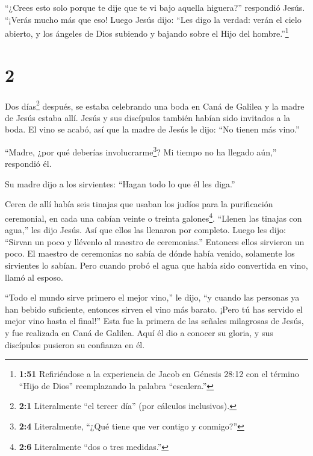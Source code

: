  ``¿Crees esto solo porque te dije que te vi bajo aquella
higuera?'' respondió Jesús. ``¡Verás mucho más que eso! 
Luego Jesús dijo: ``Les digo la verdad: verán el cielo abierto, y los
ángeles de Dios subiendo y bajando sobre el Hijo del
hombre.''\footnote{\textbf{1:51} Refiriéndose a la experiencia de Jacob
  en Génesis 28:12 con el término ``Hijo de Dios'' reemplazando la
  palabra ``escalera.''}

\hypertarget{section-1}{%
\section{2}\label{section-1}}

 Dos días\footnote{\textbf{2:1} Literalmente ``el tercer
  día'' (por cálculos inclusivos).} después, se estaba celebrando una
boda en Caná de Galilea y la madre de Jesús estaba allí. 
Jesús y sus discípulos también habían sido invitados a la boda.
 El vino se acabó, así que la madre de Jesús le dijo: ``No
tienen más vino.''

 ``Madre, ¿por qué deberías involucrarme\footnote{\textbf{2:4}
  Literalmente, ``¿Qué tiene que ver contigo y conmigo?''}? Mi tiempo no
ha llegado aún,'' respondió él.

 Su madre dijo a los sirvientes: ``Hagan todo lo que él les
diga.''

 Cerca de allí había seis tinajas que usaban los judíos para
la purificación ceremonial, en cada una cabían veinte o treinta
galones\footnote{\textbf{2:6} Literalmente ``dos o tres medidas.''}.
 ``Llenen las tinajas con agua,'' les dijo Jesús. Así que
ellos las llenaron por completo.  Luego les dijo: ``Sirvan
un poco y llévenlo al maestro de ceremonias.'' Entonces ellos sirvieron
un poco.  El maestro de ceremonias no sabía de dónde había
venido, solamente los sirvientes lo sabían. Pero cuando probó el agua
que había sido convertida en vino, llamó al esposo.

 ``Todo el mundo sirve primero el mejor vino,'' le dijo,
``y cuando las personas ya han bebido suficiente, entonces sirven el
vino más barato. ¡Pero tú has servido el mejor vino hasta el final!''
 Esta fue la primera de las señales milagrosas de Jesús, y
fue realizada en Caná de Galilea. Aquí él dio a conocer su gloria, y sus
discípulos pusieron su confianza en él.

